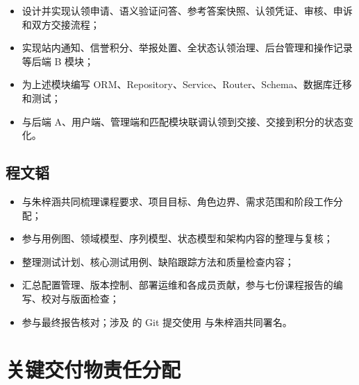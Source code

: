 \begin{itemize}
  \item 设计并实现认领申请、语义验证问答、参考答案快照、认领凭证、审核、申诉和双方交接流程；
  \item 实现站内通知、信誉积分、举报处置、全状态认领治理、后台管理和操作记录等后端 B 模块；
  \item 为上述模块编写 ORM、Repository、Service、Router、Schema、数据库迁移和测试；
  \item 与后端 A、用户端、管理端和匹配模块联调认领到交接、交接到积分的状态变化。
\end{itemize}

\subsection{程文韬}

\begin{itemize}
  \item 与朱梓涵共同梳理课程要求、项目目标、角色边界、需求范围和阶段工作分配；
  \item 参与用例图、领域模型、序列模型、状态模型和架构内容的整理与复核；
  \item 整理测试计划、核心测试用例、缺陷跟踪方法和质量检查内容；
  \item 汇总配置管理、版本控制、部署运维和各成员贡献，参与七份课程报告的编写、校对与版面检查；
  \item 参与最终报告核对；涉及  的 Git 提交使用  与朱梓涵共同署名。
\end{itemize}

\section{关键交付物责任分配}

